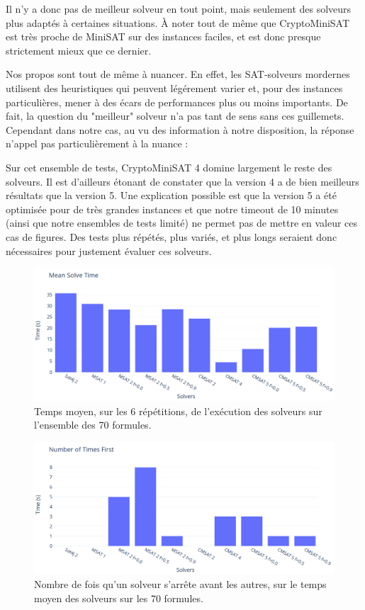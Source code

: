 \documentclass[11pt,a4paper]{article}
\begin{document}
Il n'y a donc pas de meilleur solveur en tout point, mais seulement des solveurs plus adaptés à certaines situations. À noter tout de même que CryptoMiniSAT est très proche de MiniSAT sur des instances faciles, et est donc presque strictement mieux que ce dernier.

Nos propos sont tout de même à nuancer.
En effet, les SAT-solveurs mordernes utilisent des heuristiques qui peuvent légérement varier et, pour des instances particulières, mener à des écars de performances plus ou moins importants. De fait, la question du "meilleur" solveur n'a pas tant de sens sans ces guillemets. Cependant dans notre cas, au vu des information à notre disposition, la réponse n'appel pas particulièrement à la nuance :

Sur cet ensemble de tests, CryptoMiniSAT 4 domine largement le reste des solveurs.
Il est d'ailleurs étonant de constater que la version 4 a de bien meilleurs résultats que la version 5. Une explication possible est que la version 5 a été optimisée pour de très grandes instances et que notre timeout de 10 minutes (ainsi que notre ensembles de tests limité) ne permet pas de mettre en valeur ces cas de figures. Des tests plus répétés, plus variés, et plus longs seraient donc nécessaires pour justement évaluer ces solveurs.

\begin{figure}
  \includegraphics[width=0.6\linewidth]{plot-mean.png}
  \caption{Temps moyen, sur les 6 répétitions, de l'exécution des solveurs sur l'ensemble des 70 formules. }
  \label{fig:mean}
\end{figure}

\begin{figure}
  \includegraphics[width=0.6\linewidth]{plot-first.png}
  \caption{Nombre de fois qu'un solveur s'arrête avant les autres, sur le temps moyen des solveurs sur les 70 formules.}
  \label{fig:first}
\end{figure}
\end{document}
